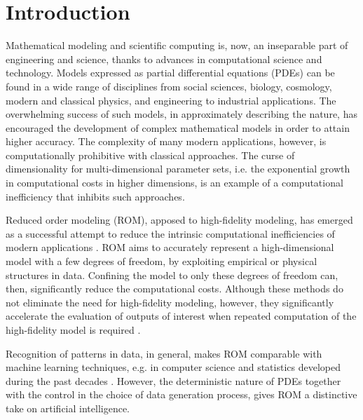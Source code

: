 \chapter{Introduction}
Mathematical modeling and scientific computing is, now, an inseparable part of engineering and science, thanks to advances in computational science and technology. Models expressed as partial differential equations (PDEs) can be found in a wide range of disciplines from social sciences, biology, cosmology, modern and classical physics, and engineering to industrial applications. The overwhelming success of such models, in approximately describing the nature, has encouraged the development of complex mathematical models in order to attain higher accuracy. The complexity of many modern applications, however, is computationally prohibitive with classical approaches. The curse of dimensionality for multi-dimensional parameter sets, i.e. the exponential growth in computational costs in higher dimensions, is an example of a computational inefficiency that inhibits such approaches.

Reduced order modeling (ROM), apposed to high-fidelity modeling, has emerged as a successful attempt to reduce the intrinsic computational inefficiencies of modern applications \cite{hesthaven2015certified,quarteroni2015reduced,doi:10.1137/1.9781611974829,doi:10.1137/1.9780898718713}. ROM aims to accurately represent a high-dimensional model with a few degrees of freedom, by exploiting empirical or physical structures in data. Confining the model to only these degrees of freedom can, then, significantly reduce the computational costs. Although these methods do not eliminate the need for high-fidelity modeling, however, they significantly accelerate the evaluation of outputs of interest when repeated computation of the high-fidelity model is required \cite{hesthaven2015certified}.


Recognition of patterns in data, in general, makes ROM comparable with machine learning techniques, e.g. in computer science and statistics developed during the past decades \cite{machinelearning}. However, the deterministic nature of PDEs together with the control in the choice of data generation process, gives ROM a distinctive take on artificial intelligence. 

